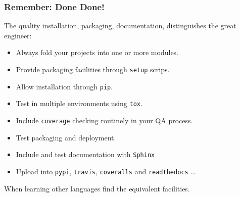 \documentclass{beamer} %
\begin{document}
\begin{frame}

\frametitle{Remember: Done Done!}

The quality installation, packaging, documentation, distinguishes the great engineer:
\begin{itemize}
  \item Always fold your projects into one or more modules.
  \item Provide packaging facilities through \texttt{setup} scrips.
  \item Allow installation through \texttt{pip}.
  \item Test in multiple environments using \texttt{tox}.
  \item Include \texttt{coverage} checking routinely in your QA process.
  \item Test packaging and deployment.
  \item Include and test documentation with \texttt{Sphinx}
  \item Upload into \texttt{pypi}, \texttt{travis}, \texttt{coveralls} and \texttt{readthedocs} \ldots
\end{itemize}

\vspace{3mm}
When learning other languages find the equivalent facilities.

\end{frame}




\end{document}
